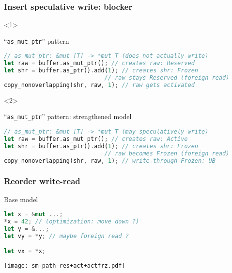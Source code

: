 \begin{frame}[fragile]
    \frametitle{Insert speculative write: blocker}
    \begin{onlyenv}<1>
        \begin{block}{{\cmark} ``\texttt{as\_mut\_ptr}'' pattern}
            \begin{lstlisting}[language=rust, basicstyle=\ttfamily\scriptsize]
// as_mut_ptr: &mut [T] -> *mut T (does not actually write)
let raw = buffer.as_mut_ptr(); // creates raw: Reserved
let shr = buffer.as_ptr().add(1); // creates shr: Frozen
                             // raw stays Reserved (foreign read)
copy_nonoverlapping(shr, raw, 1); // raw gets activated
            \end{lstlisting}
        \end{block}
    \end{onlyenv}

    \begin{onlyenv}<2>
        \begin{block}{{\xmark} ``\texttt{as\_mut\_ptr}'' pattern: strengthened model}
            \begin{lstlisting}[language=rust, basicstyle=\ttfamily\scriptsize]
// as_mut_ptr: &mut [T] -> *mut T (may speculatively write)
let raw = buffer.as_mut_ptr(); // creates raw: Active
let shr = buffer.as_ptr().add(1); // creates shr: Frozen
                             // raw becomes Frozen (foreign read)
copy_nonoverlapping(shr, raw, 1); // write through Frozen: UB
            \end{lstlisting}
        \end{block}
    \end{onlyenv}
\end{frame}

\begin{frame}[fragile, t]
    \frametitle{Reorder write-read}
    \begin{block}{{\xmark} Base model}
        \begin{lstlisting}[language=rust, basicstyle=\ttfamily\scriptsize]
let x = &mut ...;
*x = 42; // (optimization: move down ?)
let y = &...;
let vy = *y; // maybe foreign read ?

let vx = *x;
        \end{lstlisting}
    \end{block}
    \texttt{[image: sm-path-res+act+actfrz.pdf]}
\end{frame}

